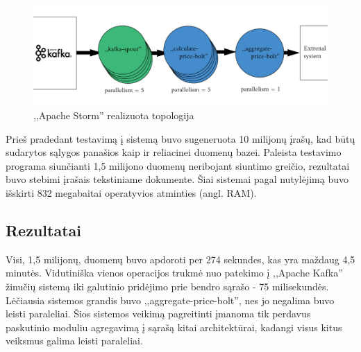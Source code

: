 \documentclass{VUMIFPSkursinis}
\begin{document}
\begin{figure}[!htbp]
    \centering
    \includegraphics[width=1\textwidth]{img/topology2.jpg}
    \caption{,,Apache Storm'' realizuota topologija}
    \label{fig:stormtopology}
\end{figure}
Prieš pradedant testavimą į sistemą buvo sugeneruota 10 milijonų įrašų, kad būtų sudarytos sąlygos panašios kaip ir reliacinei duomenų bazei.
Paleista testavimo programa siunčianti 1,5 milijono duomenų neribojant siuntimo greičio, rezultatai buvo stebimi įrašais tekstiniame dokumente.
Šiai sistemai pagal nutylėjimą buvo išskirti 832 megabaitai operatyvios atminties (angl. RAM). 
\subsection{Rezultatai}
Visi, 1,5 milijonų, duomenų buvo apdoroti per 274 sekundes, kas yra maždaug 4,5 minutės. Vidutiniška vienos operacijos trukmė nuo 
patekimo į ,,Apache Kafka'' žinučių sistemą iki galutinio pridėjimo prie bendro sąrašo - 75 milisekundės.
Lėčiausia sistemos grandis buvo ,,aggregate-price-bolt'', nes jo negalima buvo leisti paraleliai. Šios sistemos veikimą pagreitinti 
įmanoma tik perdavus paskutinio moduliu agregavimą į sąrašą kitai architektūrai, kadangi visus kitus veiksmus galima leisti paraleliai.




\end{document}
